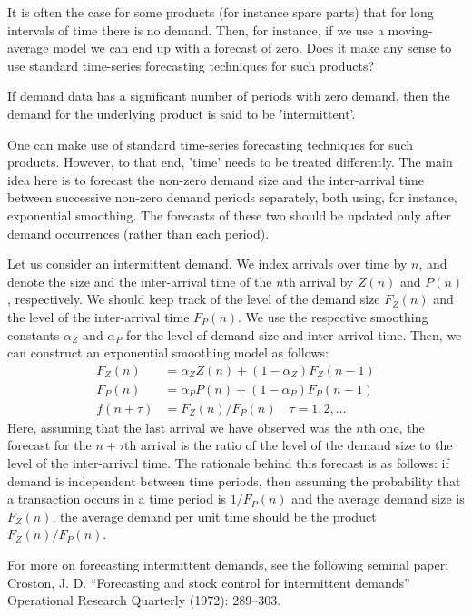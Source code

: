 \begin{question}
It is often the case for some products (for instance spare parts) that for long intervals of time there is no demand. Then, for instance, if we use a moving-average model we can end up with a forecast of zero. Does it make any sense to use standard time-series forecasting techniques for such products?
\end{question}

  \begin{solution}
  If demand data has a significant number of periods with zero demand, then the demand for the underlying product is said to be 'intermittent'. 
  
  One can make use of standard time-series forecasting techniques for such products. However, to that end, 'time' needs to be treated differently. The main idea here is to forecast the non-zero demand size and the inter-arrival time between successive non-zero demand periods separately, both using, for instance, exponential smoothing. The forecasts of these two should be updated only after demand occurrences (rather than each period). 
  
  Let us consider an intermittent demand. We index arrivals over time by $n$, and denote the size and the inter-arrival time of the $n$th arrival by $Z(n)$ and $P(n)$, respectively. We should keep track of the level of the demand size $F_Z(n)$ and the level of the inter-arrival time $F_P(n)$. We use the respective smoothing constants $\alpha_Z$ and $\alpha_P$ for the level of demand size and inter-arrival time. Then, we can construct an exponential smoothing model as follows:
\begin{align*}
F_Z(n) & = \alpha_Z Z(n) + (1-\alpha_Z) F_Z(n-1) \\
F_P(n) & = \alpha_P P(n) + (1-\alpha_P) F_P(n-1) \\
f(n+\tau) & = F_Z(n)/F_P(n) \quad \tau = 1,2,\ldots
\end{align*}   
   Here, assuming that the last arrival we have observed was the $n$th one, the forecast for the $n+\tau$th arrival is the ratio of the level of the demand size to the level of the inter-arrival time. The rationale behind this forecast is as follows: if demand is independent between time periods, then assuming the probability that a transaction occurs in a time period is $1/F_P(n)$ and the average demand size is $F_Z(n)$, the average demand per unit time should be the product $F_Z(n)/F_P(n)$.
   
For more on forecasting intermittent demands, see the following seminal paper: Croston, J. D. ``Forecasting and stock control for intermittent demands'' Operational Research Quarterly (1972): 289--303.   
  \end{solution}

